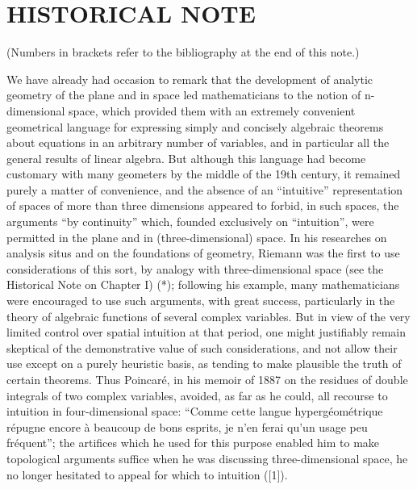 \section*{HISTORICAL NOTE}
{}

(Numbers in brackets refer to the bibliography at the end of this note.)

We have already had occasion to remark that the development of analytic geometry of the plane and in space led mathematicians to the notion of n-dimensional space, which provided them with an extremely convenient geometrical language for expressing simply and concisely algebraic theorems about equations in an arbitrary number of variables, and in particular all the general results of linear algebra. But although this language had become customary with many geometers by the middle of the 19th century, it remained purely a matter of convenience, and the absence of an ``intuitive'' representation of spaces of more than three dimensions appeared to forbid, in such spaces, the arguments ``by continuity'' which, founded exclusively on ``intuition'', were permitted in the plane and in (three-dimensional) space. In his researches on analysis situs and on the foundations of geometry, Riemann was the first to use considerations of this sort, by analogy with three-dimensional space (see the Historical Note on Chapter I) (*); following his example, many mathematicians were encouraged to use such arguments, with great success, particularly in the theory of algebraic functions of several complex variables. But in view of the very limited control over spatial intuition at that period, one might justifiably remain skeptical of the demonstrative value of such considerations, and not allow their use except on a purely heuristic basis, as tending to make plausible the truth of certain theorems. Thus Poincaré, in his memoir of 1887 on the residues of double integrals of two complex variables, avoided, as far as he could, all recourse to intuition in four-dimensional space: ``Comme cette langue hypergéométrique répugne encore à beaucoup de bons esprits, je n'en ferai qu'un usage peu fréquent''; the artifices which he used for this purpose enabled him to make topological arguments suffice when he was discussing three-dimensional space, he no longer hesitated to appeal for which to intuition ({[}1{]}).

